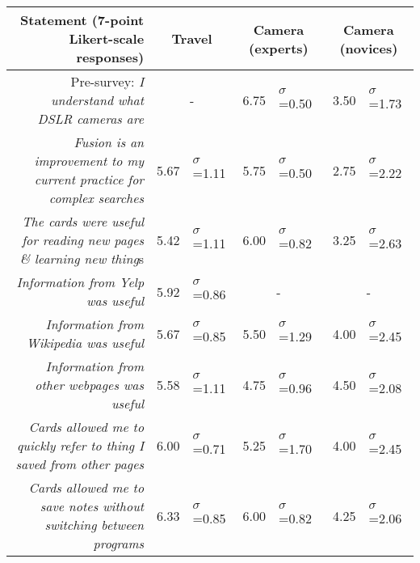 \begin{table*}
  \centering
  \footnotesize
  \begin{tabular}{ r  r l   r l r l }
  
	
	\multicolumn{1}{p{1\columnwidth}}{Statement (7-point Likert-scale responses)} &
	\multicolumn{2}{c}{Travel} &
	\multicolumn{2}{c}{Camera (experts)} &
	\multicolumn{2}{c}{Camera (novices)} \\
    
	\hline
	
	
	\multicolumn{1}{p{1\columnwidth}}{Pre-survey: \textit{I understand what DSLR cameras are}} &
	\multicolumn{2}{c}{-} &
    6.75 & $\sigma$=0.50 &
    3.50 & $\sigma$=1.73 \\
    
	\multicolumn{1}{p{1.0\columnwidth}}{\textit{Fusion is an improvement to my current practice for complex searches}} & 
    5.67  & $\sigma$=1.11 &
    5.75 & $\sigma$=0.50 &
    2.75 & $\sigma$=2.22 \\
    
	\multicolumn{1}{p{1.0\columnwidth}}{\textit{The cards were useful for reading new pages \& learning new thing}s} &
    5.42 & $\sigma$=1.11 &
    6.00 & $\sigma$=0.82 &
    3.25 & $\sigma$=2.63 \\
    
	\multicolumn{1}{p{1.0\columnwidth}}{\textit{Information from Yelp was useful
}} &
    5.92 & $\sigma$=0.86 &
	\multicolumn{2}{c}{-} &
	\multicolumn{2}{c}{-} \\
    
	\multicolumn{1}{p{1.0\columnwidth}}{\textit{Information from Wikipedia was useful}} &
    5.67 & $\sigma$=0.85 &
    5.50 & $\sigma$=1.29 &
    4.00 & $\sigma$=2.45 \\
    
	\multicolumn{1}{p{1\columnwidth}}{\textit{Information from other webpages was useful}} &
    5.58 & $\sigma$=1.11 &
    4.75 & $\sigma$=0.96 &
    4.50 & $\sigma$=2.08 \\
    
    
	\multicolumn{1}{p{1.0\columnwidth}}{\textit{Cards allowed me to quickly refer to thing I saved from other pages}} &
    6.00 & $\sigma$=0.71 &
    5.25 & $\sigma$=1.70 &
    4.00 & $\sigma$=2.45 \\
    
	\multicolumn{1}{p{1.0\columnwidth}}{\textit{Cards allowed me to save notes without switching between programs}
} &
    6.33 & $\sigma$=0.85 &
    6.00 & $\sigma$=0.82 &
    4.25 & $\sigma$=2.06 \\
    

\end{tabular}
\end{table*}
